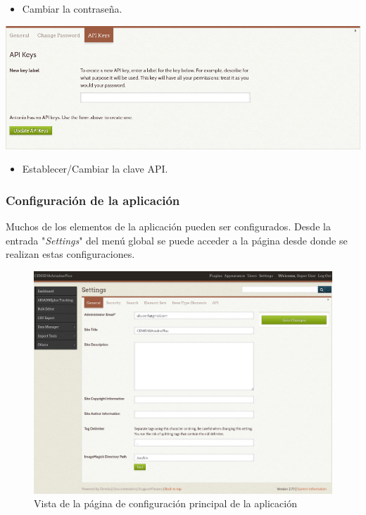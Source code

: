 \documentclass[
]{article}
\providecommand{\tightlist}{%
  \setlength{\itemsep}{0pt}\setlength{\parskip}{0pt}}
\begin{document}
\begin{enumerate}
  \begin{itemize}
  \tightlist
  \item
    Cambiar la contraseña.
  \end{itemize}

  \includegraphics{../_static/images/user-mod-3.png}

  \begin{itemize}
  \tightlist
  \item
    Establecer/Cambiar la clave API.
  \end{itemize}
\end{enumerate}

\hypertarget{configuraciuxf3n-de-la-aplicaciuxf3n}{%
\subsubsection{Configuración de la
aplicación}\label{configuraciuxf3n-de-la-aplicaciuxf3n}}

Muchos de los elementos de la aplicación pueden ser configurados. Desde
la entrada "\emph{Settings}" del menú global se puede acceder a la
página desde donde se realizan estas configuraciones.

\begin{figure}
\hypertarget{settings}{%
\centering
\includegraphics{../_static/images/settings.png}
\caption{Vista de la página de configuración principal de la
aplicación}\label{settings}
}
\end{figure}
\end{document}
